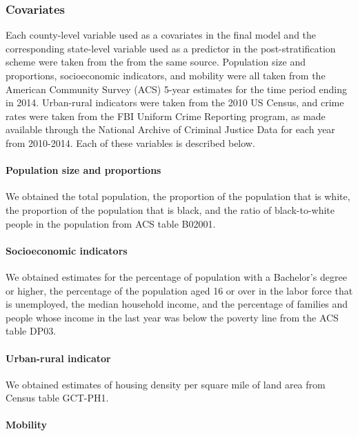 \documentclass[english,floatsintext,man]{apa6}
\theoremstyle{definition}
\theoremstyle{definition}
\theoremstyle{remark}
\begin{document}
\subsubsection{Covariates}\label{covariates}

Each county-level variable used as a covariates in the final model and
the corresponding state-level variable used as a predictor in the
post-stratification scheme were taken from the from the same source.
Population size and proportions, socioeconomic indicators, and mobility
were all taken from the American Community Survey (ACS) 5-year estimates
for the time period ending in 2014. Urban-rural indicators were taken
from the 2010 US Census, and crime rates were taken from the FBI Uniform
Crime Reporting program, as made available through the National Archive
of Criminal Justice Data for each year from 2010-2014. Each of these
variables is described below.

\paragraph{Population size and
proportions}\label{population-size-and-proportions}

We obtained the total population, the proportion of the population that
is white, the proportion of the population that is black, and the ratio
of black-to-white people in the population from ACS table B02001.

\paragraph{Socioeconomic indicators}\label{socioeconomic-indicators}

We obtained estimates for the percentage of population with a Bachelor's
degree or higher, the percentage of the population aged 16 or over in
the labor force that is unemployed, the median household income, and the
percentage of families and people whose income in the last year was
below the poverty line from the ACS table DP03.

\paragraph{Urban-rural indicator}\label{urban-rural-indicator}

We obtained estimates of housing density per square mile of land area
from Census table GCT-PH1.

\paragraph{Mobility}\label{mobility}
\end{document}
